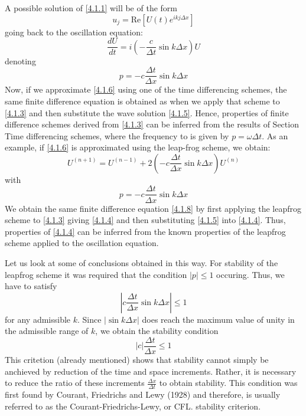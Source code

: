 A possible solution of \ref{4.1.1} will be of the form
\begin{equation}\label{4.1.5}
	u_j=\text{Re}\left[U(t)e^{ikj\Delta x}\right]
\end{equation}
going back to the oscillation equation:
\begin{equation}\label{4.1.6}
	\frac{dU}{dt}=i\left(-\frac{c}{\Delta t}\sin k\Delta x\right)U
\end{equation}
denoting
$$p=-c\frac{\Delta t}{\Delta x}\sin k\Delta x$$
Now, if we approximate \ref{4.1.6} using one of the time differencing schemes, the same finite difference equation is obtained as when we apply that scheme to \ref{4.1.3} and then substitute the wave solution \ref{4.1.5}. Hence, properties of finite difference schemes derived from \ref{4.1.3} can be inferred from the results of Section Time differencing schemes, where the frequency to is given by $p=\omega\Delta t$.
As an example, if \ref{4.1.6} is approximated using the leap-frog scheme, we obtain:
\begin{equation}\label{4.1.8}
	U^{(n+1)}=U^{(n-1)}+2\left(-c\frac{\Delta t}{\Delta x}\sin k\Delta x\right)U^{(n)}
\end{equation}
with
\begin{equation}\label{4.1.9}
	p=-c\frac{\Delta t}{\Delta x}\sin k\Delta x
\end{equation}
We obtain the same finite difference equation \ref{4.1.8} by first applying the leapfrog scheme to \ref{4.1.3} giving \ref{4.1.4} and then substituting \ref{4.1.5} into \ref{4.1.4}. Thus, properties of \ref{4.1.4} can be inferred from the known properties of the leapfrog scheme applied to the oscillation equation.

Let us look at some of conclusions obtained in this way. For stability of the leapfrog scheme it was required that the condition $|p|\leq 1$ occuring. Thus, we have to satisfy
\begin{equation}
	\left|c\frac{\Delta t}{\Delta x}\sin k\Delta x\right|\leq 1
\end{equation}
for any admissible $k$. Since $|\sin k\Delta x|$ does reach the maximum value of unity in the admissible range of $k$, we obtain the stability condition
\begin{equation}\label{4.1.10}
	|c|\frac{\Delta t}{\Delta x}\leq 1
\end{equation}
This critetion (already mentioned) shows that stability cannot simply be anchieved by reduction of the time and space increments. Rather, it is necessary to reduce the ratio of these increments $\frac{\Delta x}{\Delta t}$ to obtain stability. This condition was first found by Courant, Friedrichs and Lewy (1928) and therefore, is usually referred to as the Courant-Friedrichs-Lewy, or CFL. stability criterion.

